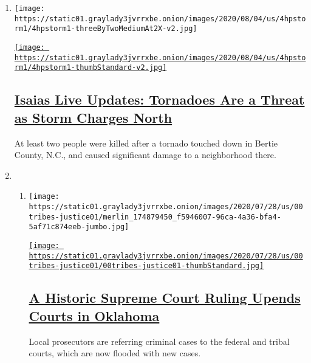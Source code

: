 \begin{enumerate}
\def\labelenumi{\arabic{enumi}.}
\item
  \texttt{[image: https://static01.graylady3jvrrxbe.onion/images/2020/08/04/us/4hpstorm1/4hpstorm1-threeByTwoMediumAt2X-v2.jpg]}

  \href{/2020/08/04/us/isaias-storm-updates.html}{\texttt{[image: https://static01.graylady3jvrrxbe.onion/images/2020/08/04/us/4hpstorm1/4hpstorm1-thumbStandard-v2.jpg]}}

  \hypertarget{isaias-live-updates-tornadoes-are-a-threat-as-storm-charges-north}{%
  \subsection{\texorpdfstring{\href{/2020/08/04/us/isaias-storm-updates.html}{Isaias
  Live Updates: Tornadoes Are a Threat as Storm Charges
  North}}{Isaias Live Updates: Tornadoes Are a Threat as Storm Charges North}}\label{isaias-live-updates-tornadoes-are-a-threat-as-storm-charges-north}}

  At least two people were killed after a tornado touched down in Bertie
  County, N.C., and caused significant damage to a neighborhood there.
\item
  \begin{enumerate}
  \def\labelenumii{\arabic{enumii}.}
  \item
    \texttt{[image: https://static01.graylady3jvrrxbe.onion/images/2020/07/28/us/00tribes-justice01/merlin\_174879450\_f5946007-96ca-4a36-bfa4-5af71c874eeb-jumbo.jpg]}

    \href{/2020/08/03/us/Supreme-court-Oklahoma-tribal-land-ruling.html}{\texttt{[image: https://static01.graylady3jvrrxbe.onion/images/2020/07/28/us/00tribes-justice01/00tribes-justice01-thumbStandard.jpg]}}

    \hypertarget{a-historic-supreme-court-ruling-upends-courts-in-oklahoma}{%
    \subsection{\texorpdfstring{\href{/2020/08/03/us/Supreme-court-Oklahoma-tribal-land-ruling.html}{A
    Historic Supreme Court Ruling Upends Courts in
    Oklahoma}}{A Historic Supreme Court Ruling Upends Courts in Oklahoma}}\label{a-historic-supreme-court-ruling-upends-courts-in-oklahoma}}

    Local prosecutors are referring criminal cases to the federal and
    tribal courts, which are now flooded with new cases.


\end{enumerate}
\end{enumerate}
